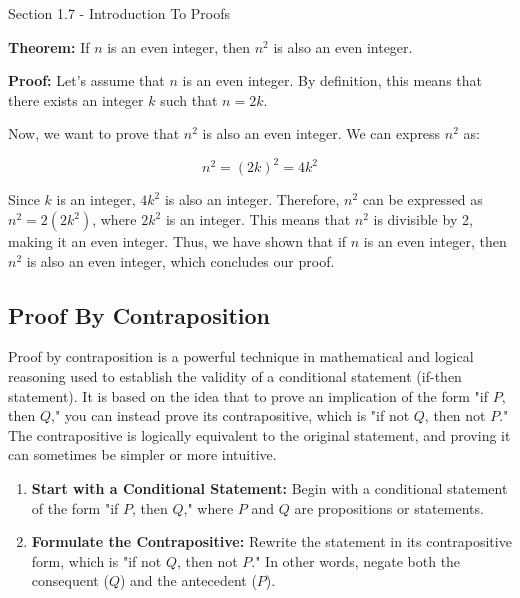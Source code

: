 \begin{notes}{Section 1.7 - Introduction To Proofs}
    \begin{Highlight}
        \textbf{Theorem:} If \(n\) is an even integer, then \(n^2\) is also an even integer. \vspace*{1em}


        \textbf{Proof:} Let's assume that \(n\) is an even integer. By definition, this means that there exists an integer \(k\) such that \(n = 2k\). 
        
        Now, we want to prove that \(n^2\) is also an even integer. We can express \(n^2\) as:
        
        \[n^2 = (2k)^2 = 4k^2\]

        
        Since \(k\) is an integer, \(4k^2\) is also an integer. Therefore, \(n^2\) can be expressed as \(n^2 = 2(2k^2)\), where \(2k^2\) is an integer. This means that \(n^2\) is divisible by 2, making it an 
        even integer. Thus, we have shown that if \(n\) is an even integer, then \(n^2\) is also an even integer, which concludes our proof.
    \end{Highlight}

    \subsection*{Proof By Contraposition}

    Proof by contraposition is a powerful technique in mathematical and logical reasoning used to establish the validity of a conditional statement (if-then statement). It is based on the idea that to prove an 
    implication of the form "if $P$, then $Q$," you can instead prove its contrapositive, which is "if not $Q$, then not $P$." The contrapositive is logically equivalent to the original statement, and proving 
    it can sometimes be simpler or more intuitive.

    \begin{enumerate}
        \item \textbf{Start with a Conditional Statement:} Begin with a conditional statement of the form "if $P$, then $Q$," where $P$ and $Q$ are propositions or statements.
        
        \item \textbf{Formulate the Contrapositive:} Rewrite the statement in its contrapositive form, which is "if not $Q$, then not $P$." In other words, negate both the consequent ($Q$) and the antecedent ($P$).
        

\end{enumerate}
\end{notes}
